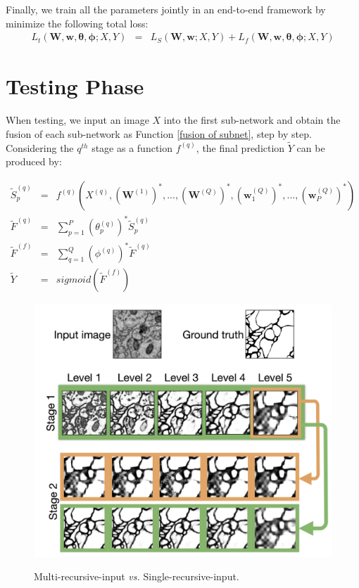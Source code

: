 \documentclass[senior]{IPSstyle}
\begin{document}
Finally, we train all the parameters jointly in an end-to-end framework by minimize the following total loss:
\begin{eqnarray}
L_{t}(\textbf{W}, \textbf{w}, \mathbf{\theta}, \mathbf{\phi}; X, Y) &=& L_S(\textbf{W}, \textbf{w}; X, Y) + L_{f}(\textbf{W}, \textbf{w}, \mathbf{\theta}, \mathbf{\phi}; X, Y)
\end{eqnarray}

\section{Testing Phase} \label{testing phase}
When testing, we input an image \(X\) into the first sub-network and obtain the fusion of each sub-network as Function \ref{fusion of subnet}, step by step. Considering the \(q^{th}\) stage as a function \(f^{(q)}\), the final prediction \(\tilde{Y}\) can be produced by:

\begin{eqnarray}
\tilde{S}_{p}^{(q)} &=& f^{(q)}(X^{(q)}, (\textbf{W}^{(1)})^{*}, ... , (\textbf{W}^{(Q)})^{*}, (\textbf{w}_{1}^{(Q)})^{*}, ... , (\textbf{w}_{P}^{(Q)})^{*}) \\
\tilde{F}^{(q)} &=& \sum_{p=1}^{P}(\theta_{p}^{(q)})^{*}\tilde{S}_{p}^{(q)} \\
\tilde{F}^{(f)} &=& \sum_{q=1}^{Q}(\phi^{(q)})^{*}\tilde{F}^{(q)} \\
\tilde{Y} &=& sigmoid(\tilde{F}^{(f)})
\end{eqnarray}

\begin{figure}[t]
  \centering
  \includegraphics[width=15cm]{multi-recursive-input.png}\\
  \caption{Multi-recursive-input \emph{vs.} Single-recursive-input.}\label{multi recursive input}
\end{figure}
\end{document}

